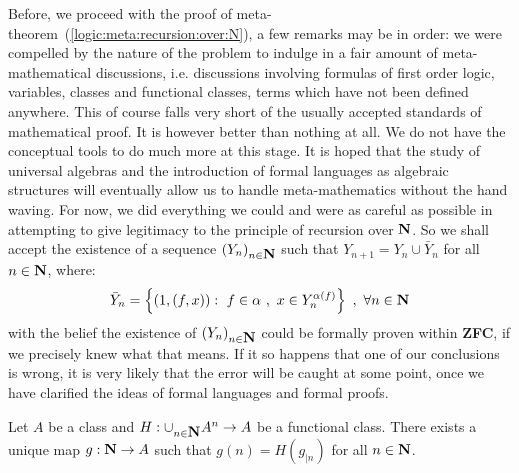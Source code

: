 Before, we proceed with the proof of
meta-theorem~(\ref{logic:meta:recursion:over:N}), a few remarks may
be in order: we were compelled by the nature of the problem to
indulge in a fair amount of meta-mathematical discussions, i.e.
discussions involving formulas of first order logic, variables,
classes and functional classes, terms which have not been defined
anywhere. This of course falls very short of the usually accepted
standards of mathematical proof. It is however better than nothing
at all. We do not have the conceptual tools to do much more at this
stage. It is hoped that the study of universal algebras and the
introduction of formal languages as algebraic structures will
eventually allow us to handle meta-mathematics without the hand
waving.   For now, we did everything we could and were as careful as
possible in attempting to give legitimacy to the principle of
recursion over $\mbox{$\bf N$}$. So we shall accept the existence of a sequence
$(Y_{n})_{n\in\mbox{$\bf N$}}$ such that $Y_{n+1}=Y_{n}\cup\bar{Y}_{n}$ for all
$n\in\mbox{$\bf N$}$, where:
    \[
    \bar{Y}_{n}=\left\{(1,(f,x)):\ f\in\alpha\ ,\ x\in Y_{n}^{\alpha(f)}\right\}\ ,\
    \forall n\in\N
    \]
with the belief the existence of $(Y_{n})_{n\in\mbox{$\bf N$}}$ could be
formally proven within {\bf ZFC}, if we precisely knew what that
means. If it so happens that one of our conclusions is wrong, it is
very likely that the error will be caught at some point, once we
have clarified the ideas of formal languages and formal proofs.
\begin{metath}\label{logic:meta:recursion:over:N}
Let $A$ be a class and $H:\cup_{n\in\mbox{$\bf N$}}A^{n}\to A$ be a functional
class. There exists a unique map $g:\mbox{$\bf N$}\to A$ such that
$g(n)=H(g_{|n})$ for all $n\in\mbox{$\bf N$}$.
\end{metath}
